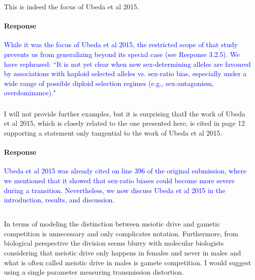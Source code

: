\documentclass[10pt,letterpaper]{article}
\begin{document}
This is indeed the focus of Ubeda et al 2015.

\noindent\paragraph{Response}
\textcolor{blue}{While it was the focus of Ubeda et al 2015, the restricted scope of that study prevents us from generalizing beyond its special case (see Response 3.2.5).
We have rephrased: ``It is not yet clear when new sex-determining alleles are favoured by associations with haploid selected alleles vs. sex-ratio bias, especially under a wide range of possible diploid selection regimes (e.g., sex-antagonism, overdominance)."
}

\noindent\subsubsection{}
I will not provide further examples, but it is surprising thatI the work of Ubeda et al 2015, which is closely related to the one presented here, is cited in page 12 supporting a statement only tangential to the work of Ubeda et al 2015.

\noindent\paragraph{Response}
\textcolor{blue}{Ubeda et al 2015 was already cited on line 396 of the original submission, where we mentioned that it showed that sex-ratio biases could become more severe during a transition.
Nevertheless, we now discuss Ubeda et al 2015 in the introduction, results, and discussion.}

\noindent\subsection{}
In terms of modeling the distinction between meiotic drive and gametic competition is unnecessary and only complicates notation. Furthermore, from biological perspective the division seems blurry with molecular biologists considering that meiotic drive only happens in females and never in males and what is often called meiotic drive in males is gamete competition. I would suggest using a single parameter measuring transmission distortion.
\end{document}
